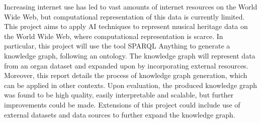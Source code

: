 Increasing internet use has led to vast amounts of internet resources on the World Wide Web, but computational representation of this data is currently limited. This project aims to apply AI techniques to represent musical heritage data on the World Wide Web, where computational representation is scarce. In particular, this project will use the tool SPARQL Anything to generate a knowledge graph, following an ontology. The knowledge graph will represent data from an organ dataset and expanded upon by incorporating external resources. Moreover, this report details the process of knowledge graph generation, which can be applied in other contexts. Upon evaluation, the produced knowledge graph was found to be high quality, easily interpretable and scalable, but further improvements could be made. Extensions of this project could include use of external datasets and data sources to further expand the knowledge graph. 

